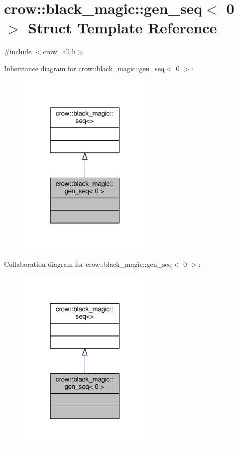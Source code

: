 \hypertarget{structcrow_1_1black__magic_1_1gen__seq_3_010_01_4}{\section{crow\-:\-:black\-\_\-magic\-:\-:gen\-\_\-seq$<$ 0 $>$ Struct Template Reference}
\label{structcrow_1_1black__magic_1_1gen__seq_3_010_01_4}
}


{\ttfamily \#include $<$crow\-\_\-all.\-h$>$}



Inheritance diagram for crow\-:\-:black\-\_\-magic\-:\-:gen\-\_\-seq$<$ 0 $>$\-:
\nopagebreak
\begin{figure}[H]
\begin{center}
\leavevmode
\includegraphics[width=184pt]{structcrow_1_1black__magic_1_1gen__seq_3_010_01_4__inherit__graph}
\end{center}
\end{figure}


Collaboration diagram for crow\-:\-:black\-\_\-magic\-:\-:gen\-\_\-seq$<$ 0 $>$\-:
\nopagebreak
\begin{figure}[H]
\begin{center}
\leavevmode
\includegraphics[width=184pt]{structcrow_1_1black__magic_1_1gen__seq_3_010_01_4__coll__graph}
\end{center}
\end{figure}
